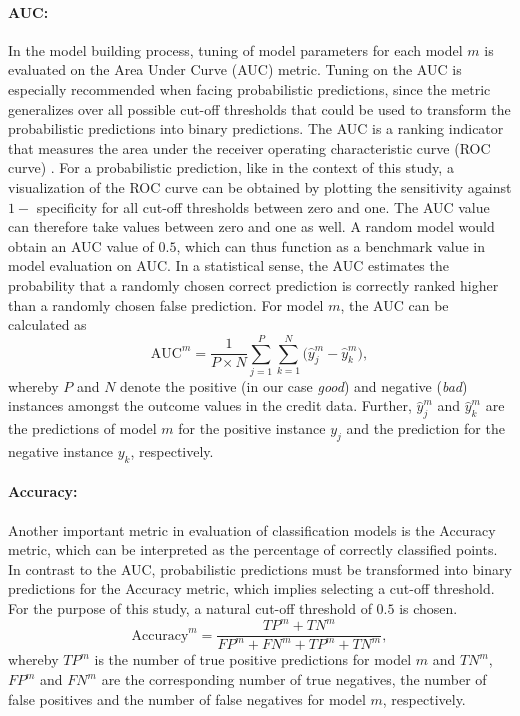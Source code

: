 \documentclass[12pt]{article}
\begin{document}
\paragraph{AUC:} In the model building process, tuning of model parameters for each model $m$ is evaluated on the Area Under Curve (AUC) metric. Tuning on the AUC is especially recommended when facing probabilistic predictions, since the metric generalizes over all possible cut-off thresholds that could be used to transform the probabilistic predictions into binary predictions. The AUC is a ranking indicator that measures the area under the receiver operating characteristic curve (ROC curve) \citep{hanley1982meaning}. For a probabilistic prediction, like in the context of this study, a visualization of the ROC curve can be obtained by plotting the sensitivity against $1 -$ specificity for all cut-off thresholds between zero and one. The AUC value can therefore take values between zero and one as well. A random model would obtain an AUC value of $0.5$, which can thus function as a benchmark value in model evaluation on AUC. In a statistical sense, the AUC estimates the probability that a randomly chosen correct prediction is correctly ranked higher than a randomly chosen false prediction. For model $m$, the AUC can be calculated as
\begin{equation}
\text{AUC}^m = \frac{1}{P \times N}\sum_{j=1}^{P}\sum_{k=1}^{N}\big(\hat{y}^m_j - \hat{y}^m_k\big),
\end{equation}
whereby $P$ and $N$ denote the positive (in our case \textit{good}) and negative (\textit{bad}) instances amongst the outcome values in the credit data. Further, $\hat{y}^m_j$ and $\hat{y}^m_k$ are the predictions of model $m$ for the positive instance $y_j$ and the prediction for the negative instance $y_k$, respectively.

\paragraph{Accuracy:} Another important metric in evaluation of classification models is the Accuracy metric, which can be interpreted as the percentage of correctly classified points. In contrast to the AUC, probabilistic predictions must be transformed into binary predictions for the Accuracy metric, which implies selecting a cut-off threshold. For the purpose of this study, a natural cut-off threshold of $0.5$ is chosen.
\begin{equation}
\text{Accuracy}^m = \frac{TP^m + TN^m}{FP^m + FN^m + TP^m + TN^m},
\end{equation}
whereby $TP^m$ is the number of true positive predictions for model $m$ and $TN^m$, $FP^m$ and $FN^m$ are the corresponding number of true negatives, the number of false positives and the number of false negatives for model $m$, respectively.
\end{document}
